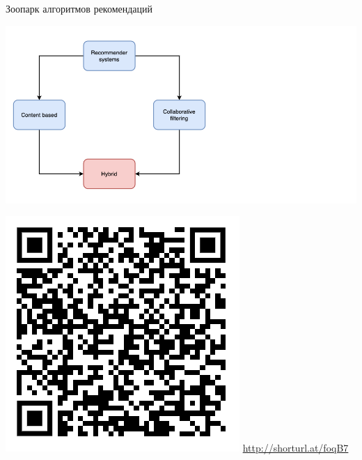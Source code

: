 \documentclass[11pt,aspectratio=169,handout]{beamer}
\begin{document}
\begin{frame}{Зоопарк алгоритмов рекомендаций \cite{ali_2021}}

\begin{center}
\includegraphics[scale=0.27]{images/taxonomy-4.png}
\end{center}

\includegraphics[scale=0.3]{images/poll.png} \hfill \url{http://shorturl.at/foqB7}

\end{frame}
\end{document}
